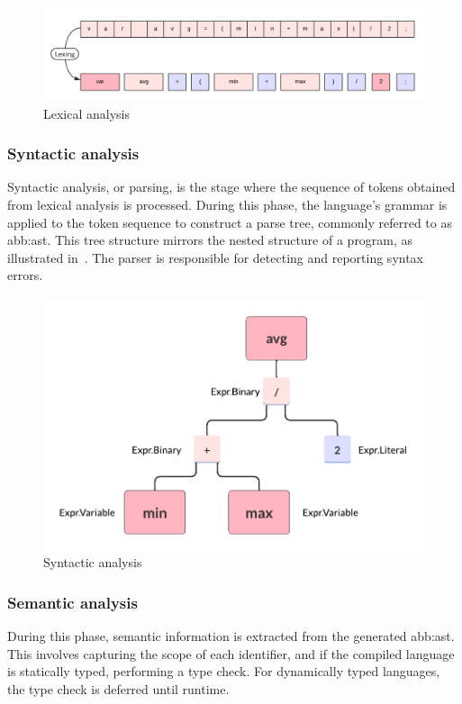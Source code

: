             \begin{figure}[hbt!]
                \begin{center}
                \includegraphics[width=.9\textwidth]{assets/images/lexing.png}
                \end{center}
                \caption{Lexical analysis}%
                \label{fig:aco:general:lexing}
            \end{figure}


        \subsubsection{Syntactic analysis}            
            Syntactic analysis, or parsing, is the stage where the sequence of tokens obtained from lexical analysis is processed. During this phase, the language's grammar is applied to the token sequence to construct a parse tree, commonly referred to as \gls{abb:ast}. This tree structure mirrors the nested structure of a program, as illustrated in~. The parser is responsible for detecting and reporting syntax errors.

            \begin{figure}[hbt!]
                \begin{center}
                \includegraphics[width=.6\textwidth]{assets/images/ast.png}
                \end{center}
                \caption{Syntactic analysis}
                \label{fig:aco:general:ast}
            \end{figure}


        \subsubsection{Semantic analysis} 
            During this phase, semantic information is extracted from the generated \gls{abb:ast}. This involves capturing the scope of each identifier, and if the compiled language is statically typed, performing a type check. For dynamically typed languages, the type check is deferred until runtime.

